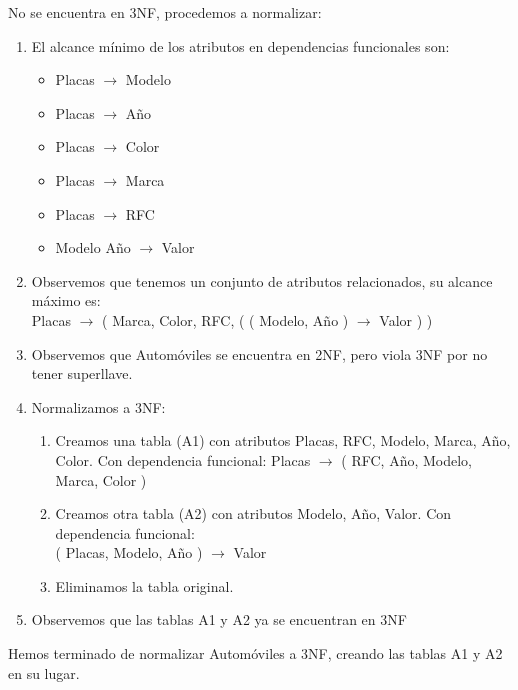 \documentclass{article}
\begin{document}
      \noindent No se encuentra en 3NF, procedemos a normalizar:
      \begin{enumerate}
      \item El alcance mínimo de los atributos en dependencias funcionales son:
        \begin{multicols}{2}
          \begin{itemize}
          \item Placas $\rightarrow$ Modelo
          \item Placas $\rightarrow$ Año
          \item Placas $\rightarrow$ Color
          \item Placas $\rightarrow$ Marca
          \item Placas $\rightarrow$ RFC
          \item Modelo Año $\rightarrow$ Valor
          \end{itemize}
        \end{multicols}
      \item Observemos que tenemos un conjunto de atributos relacionados,
        su alcance máximo es:\\
        
        Placas $\rightarrow$ ( Marca, Color, RFC, ( ( Modelo, Año ) $\rightarrow$  Valor ) )

      \item Observemos que Automóviles se encuentra en 2NF, pero viola 3NF por no tener superllave.
        
      \item Normalizamos a 3NF:
        \begin{enumerate}
        \item Creamos una tabla (A1) con atributos Placas, RFC, Modelo, Marca, Año, Color.
          Con dependencia funcional: Placas $\rightarrow$ ( RFC, Año, Modelo, Marca, Color )
        \item Creamos otra tabla (A2) con atributos Modelo, Año, Valor. Con dependencia funcional:\\
          ( Placas, Modelo, Año ) $\rightarrow$ Valor
        \item Eliminamos la tabla original.
        \end{enumerate}
      \item Observemos que las tablas A1 y A2 ya se encuentran en 3NF
      \end{enumerate}
      Hemos terminado de normalizar Automóviles a 3NF, creando las tablas A1 y A2
      en su lugar.
      
\end{document}
